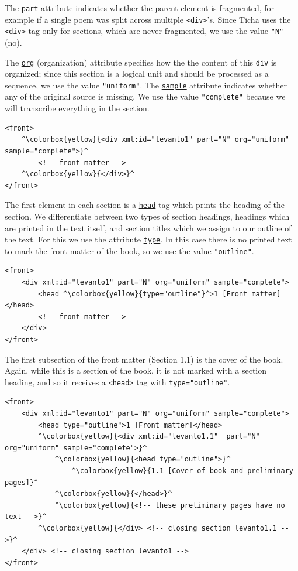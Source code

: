 \documentclass[12pt,a4paper]{article}
\begin{document}
The \hyperref[att-sec:part]{\texttt{part}} attribute indicates whether  the parent element is fragmented, for example if a single poem was split across multiple \texttt{<div>}'s.  Since Ticha uses the \texttt{<div>} tag only for sections, which are never fragmented, we use the value \texttt{"N"} (no).

The \hyperref[att-sec:org]{\texttt{org}} (organization) attribute specifies how the the content of this \texttt{div} is organized; since this section is a logical unit and should be processed as a sequence, we use the value \texttt{"uniform"}.  The \hyperref[att-sec:sample]{\texttt{sample}} attribute 	indicates whether any of the original source is missing.  We use the value \texttt{"complete"} because we will transcribe everything in the section.

\begin{lstlisting}[showtabs=true]
<front>
	^\colorbox{yellow}{<div xml:id="levanto1" part="N" org="uniform" sample="complete">}^
		<!-- front matter -->
	^\colorbox{yellow}{</div>}^
</front>
\end{lstlisting}

The first element in each section is a \hyperref[tag-sec:head]{\texttt{head}} tag which prints the heading of the section.  We differentiate between two types of section headings, headings which are printed in the text itself, and section titles which we assign to our outline of the text.  For this we use the attribute \hyperref[att-sec:part]{\texttt{type}}.  In this case there is no printed text to mark the front matter of the book, so we use the value \texttt{"outline"}.

\begin{lstlisting}
<front>
	<div xml:id="levanto1" part="N" org="uniform" sample="complete"> 
		<head ^\colorbox{yellow}{type="outline"}^>1 [Front matter]</head>
		<!-- front matter -->
	</div>
</front>
\end{lstlisting}

The first subsection of the front matter (Section 1.1) is the cover of the book.  Again, while this is a section of the book, it is not marked with a section heading, and so it receives a \texttt{<head>} tag with \texttt{type="outline"}.

\begin{lstlisting}
<front>
	<div xml:id="levanto1" part="N" org="uniform" sample="complete"> 
		<head type="outline">1 [Front matter]</head>
		^\colorbox{yellow}{<div xml:id="levanto1.1"  part="N" org="uniform" sample="complete">}^
			^\colorbox{yellow}{<head type="outline">}^
				^\colorbox{yellow}{1.1 [Cover of book and preliminary pages]}^
			^\colorbox{yellow}{</head>}^
			^\colorbox{yellow}{<!-- these preliminary pages have no text -->}^
		^\colorbox{yellow}{</div> <!-- closing section levanto1.1 -->}^
	</div> <!-- closing section levanto1 -->
</front>
\end{lstlisting}
\end{document}
